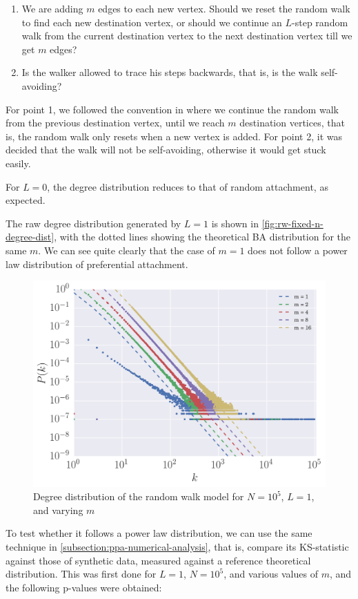 \begin{enumerate}
	\item We are adding $m$ edges to each new vertex. Should we reset the random walk to find each new destination vertex, or should we continue an $L$-step random walk from the current destination vertex to the next destination vertex till we get $m$ edges?
	\item Is the walker allowed to trace his steps backwards, that is, is the walk self-avoiding?
\end{enumerate}

For point 1, we followed the convention in \citet{Saramaki2004} where we continue the random walk from the previous destination vertex, until we reach $m$ destination vertices, that is, the random walk only resets when a new vertex is added. For point 2, it was decided that the walk will not be self-avoiding, otherwise it would get stuck easily. 

For $L=0$, the degree distribution reduces to that of random attachment, as expected. 

The raw degree distribution generated by $L = 1$ is shown in \autoref{fig:rw-fixed-n-degree-dist}, with the dotted lines showing the theoretical BA distribution for the same $m$. We can see quite clearly that the case of $m = 1$ does not follow a power law distribution of preferential attachment. 

\begin{figure}
    \centering
    \includegraphics[height=0.5\linewidth]{img/rw-fixed-n-degree-dist}
    \caption{Degree distribution of the random walk model for $N=10^5$, $L=1$, and varying $m$}
    \label{fig:rw-fixed-n-degree-dist}
\end{figure}

To test whether it follows a power law distribution, we can use the same technique in \autoref{subsection:ppa-numerical-analysis}, that is, compare its KS-statistic against those of synthetic data, measured against a reference theoretical distribution. This was first done for $L=1$, $N=10^5$, and various values of $m$, and the following p-values were obtained:

